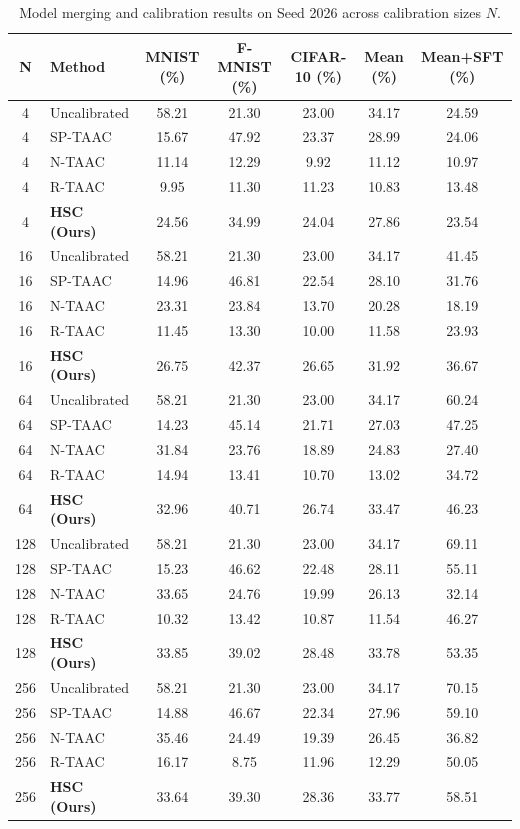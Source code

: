 \documentclass{article}
\begin{document}
\begin{table}[t]
\caption{Model merging and calibration results on Seed 2026 across calibration sizes $N$.}
\label{tab:seed2026}
\vskip 0.1in
\begin{center}
\begin{small}
\setlength{\tabcolsep}{6pt}
\begin{tabular}{clccccc}
\toprule
N & Method & MNIST (\%) & F-MNIST (\%) & CIFAR-10 (\%) & Mean (\%) & Mean+SFT (\%) \\
\midrule
4 & Uncalibrated & 58.21 & 21.30 & 23.00 & 34.17 & 24.59 \\
4 & SP-TAAC & 15.67 & 47.92 & 23.37 & 28.99 & 24.06 \\
4 & N-TAAC & 11.14 & 12.29 & 9.92 & 11.12 & 10.97 \\
4 & R-TAAC & 9.95 & 11.30 & 11.23 & 10.83 & 13.48 \\
4 & \textbf{HSC (Ours)} & 24.56 & 34.99 & 24.04 & 27.86 & 23.54 \\
\midrule
16 & Uncalibrated & 58.21 & 21.30 & 23.00 & 34.17 & 41.45 \\
16 & SP-TAAC & 14.96 & 46.81 & 22.54 & 28.10 & 31.76 \\
16 & N-TAAC & 23.31 & 23.84 & 13.70 & 20.28 & 18.19 \\
16 & R-TAAC & 11.45 & 13.30 & 10.00 & 11.58 & 23.93 \\
16 & \textbf{HSC (Ours)} & 26.75 & 42.37 & 26.65 & 31.92 & 36.67 \\
\midrule
64 & Uncalibrated & 58.21 & 21.30 & 23.00 & 34.17 & 60.24 \\
64 & SP-TAAC & 14.23 & 45.14 & 21.71 & 27.03 & 47.25 \\
64 & N-TAAC & 31.84 & 23.76 & 18.89 & 24.83 & 27.40 \\
64 & R-TAAC & 14.94 & 13.41 & 10.70 & 13.02 & 34.72 \\
64 & \textbf{HSC (Ours)} & 32.96 & 40.71 & 26.74 & 33.47 & 46.23 \\
\midrule
128 & Uncalibrated & 58.21 & 21.30 & 23.00 & 34.17 & 69.11 \\
128 & SP-TAAC & 15.23 & 46.62 & 22.48 & 28.11 & 55.11 \\
128 & N-TAAC & 33.65 & 24.76 & 19.99 & 26.13 & 32.14 \\
128 & R-TAAC & 10.32 & 13.42 & 10.87 & 11.54 & 46.27 \\
128 & \textbf{HSC (Ours)} & 33.85 & 39.02 & 28.48 & 33.78 & 53.35 \\
\midrule
256 & Uncalibrated & 58.21 & 21.30 & 23.00 & 34.17 & 70.15 \\
256 & SP-TAAC & 14.88 & 46.67 & 22.34 & 27.96 & 59.10 \\
256 & N-TAAC & 35.46 & 24.49 & 19.39 & 26.45 & 36.82 \\
256 & R-TAAC & 16.17 & 8.75 & 11.96 & 12.29 & 50.05 \\
256 & \textbf{HSC (Ours)} & 33.64 & 39.30 & 28.36 & 33.77 & 58.51 \\
\bottomrule
\end{tabular}
\end{small}
\end{center}
\end{table}
\end{document}
